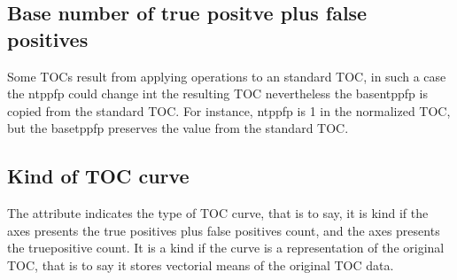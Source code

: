 \documentclass[letterpaper,10pt,english]{sphinxmanual}
\begin{document}
\subsection{Base number of true positve plus false positives}
\label{\detokenize{usage:base-number-of-true-positve-plus-false-positives}}

\begin{fulllineitems}
\label{\detokenize{usage:ootoc.TOC.basentppfp}}
\pysigstartsignatures
{}
\pysigstopsignatures
\sphinxAtStartPar
Some TOCs result from applying operations to an standard TOC, in such a case the ntppfp could change int the resulting TOC nevertheless the basentppfp is copied from the standard TOC.
For instance, ntppfp is 1 in the normalized TOC, but the basetppfp preserves the value from the standard TOC.

\end{fulllineitems}



\subsection{Kind of TOC curve}
\label{\detokenize{usage:kind-of-toc-curve}}

\begin{fulllineitems}
\label{\detokenize{usage:ootoc.TOC.kind}}
\pysigstartsignatures
{}
\pysigstopsignatures
\sphinxAtStartPar
The  attribute indicates the type of TOC curve, that is to say, it is  kind if the  axes presents the true positives plus false positives count, and the  axes presents the true\sphinxhyphen{}positive count.
It is a  kind if the curve is a representation of the original TOC, that is to say it stores  vectorial means of the original TOC data.

\end{fulllineitems}
\end{document}
